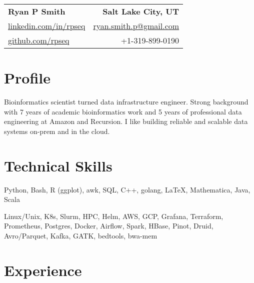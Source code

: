
\RequirePackage{preamble}



\begin{tabular*}{\textwidth}{l@{\extracolsep{\fill}}r}
	\textbf{{\Large Ryan P Smith}} & \textbf{Salt Lake City, UT} \\
	\href{http://www.linkedin.com/in/rpseq}{linkedin.com/in/rpseq} &
	\href{mailto:ryan.smith.p@gmail.com}{ryan.smith.p@gmail.com} \\
	\href{https://github.com/RPSeq}{github.com/rpseq} & +1-319-899-0190 \\
\end{tabular*}

\section{Profile}

\small{Bioinformatics scientist turned data infrastructure engineer. Strong background with 7 years of academic bioinformatics work and 5 years of professional data engineering at Amazon and Recursion. I like building reliable and scalable data systems on-prem and in the cloud.}


\section{Technical Skills}
\resumeSubHeadingListStart

{Python, Bash, R (ggplot), awk, SQL, C++, golang, \LaTeX, Mathematica, Java, Scala}

{Linux/Unix, K8s, Slurm, HPC, Helm, AWS, GCP, Grafana, Terraform, Prometheus, Postgres, Docker, Airflow, Spark, HBase, Pinot, Druid, Avro/Parquet, Kafka, GATK, bedtools, bwa-mem}

\resumeSubHeadingListEnd

\section{Experience}
\resumeSubHeadingListStart



